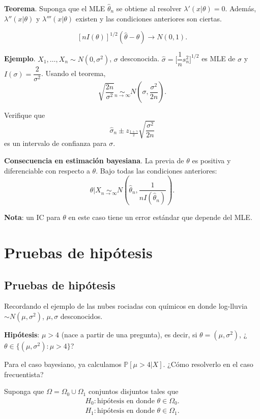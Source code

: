 \documentclass[
  12pt,
]{book}
\begin{document}
\textbf{Teorema}. Suponga que el MLE \(\hat \theta_n\) se obtiene al resolver \(\lambda'(x|\theta) = 0\). Además, \(\lambda''(x|\theta)\) y \(\lambda'''(x|\theta)\) existen y las condiciones anteriores son ciertas.

\[[nI(\theta)]^{1/2}(\hat\theta-\theta) \to N(0,1).\]

\textbf{Ejemplo}. \(X_1,\dots, X_n \sim N(0,\sigma^2)\), \(\sigma\) desconocida. \(\hat\sigma = \bigg[\dfrac 1n s_n^2\bigg]^{1/2}\) es MLE de \(\sigma\) y \(I(\sigma) = \dfrac 2{\sigma^2}\).
Usando el teorema,
\[\sqrt{\dfrac{2n}{\sigma^2}}\underset{n\to\infty}{\sim} N\left(\sigma,\dfrac{\sigma^2}{2n}\right).\]

Verifique que
\[\hat\sigma_n\pm z_{\frac{1+\gamma}{2}}\sqrt{\dfrac{\sigma^2}{2n}}\]
es un intervalo de confianza para \(\sigma\).

\textbf{Consecuencia en estimación bayesiana}. La previa de \(\theta\) es positiva y diferenciable con respecto a \(\theta\). Bajo todas las condiciones anteriores:
\[\theta|X\underset{n\to\infty}{\sim} N\left(\hat\theta_n,\dfrac 1{nI(\hat\theta_n)}\right).\]

\textbf{Nota}: un IC para \(\theta\) en este caso tiene un error estándar que depende del MLE.

\hypertarget{pruebas-de-hipuxf3tesis}{%
\chapter{Pruebas de hipótesis}\label{pruebas-de-hipuxf3tesis}}

\hypertarget{pruebas-de-hipuxf3tesis-1}{%
\section{Pruebas de hipótesis}\label{pruebas-de-hipuxf3tesis-1}}

Recordando el ejemplo de las nubes rociadas con químicos en donde log-lluvia \(\sim N(\mu,\sigma^2)\), \(\mu,\sigma\) desconocidos.

\textbf{Hipótesis}: \(\mu>4\) (nace a partir de una pregunta), es decir, si \(\theta = (\mu,\sigma^2)\), ¿\(\theta\in\{(\mu,\sigma^2): \mu>4\}\)?

Para el caso bayesiano, ya calculamos \(\mathbb P[\mu>4|X]\). ¿Cómo resolverlo en el caso frecuentista?

Suponga que \(\Omega = \Omega_0 \cup\Omega_1\) conjuntos disjuntos tales que
\begin{align*}
H_0 :  \text{hipótesis en donde }\theta \in \Omega_0.\\
H_1 : \text{hipótesis en donde }\theta \in \Omega_1.\\
\end{align*}
\end{document}
